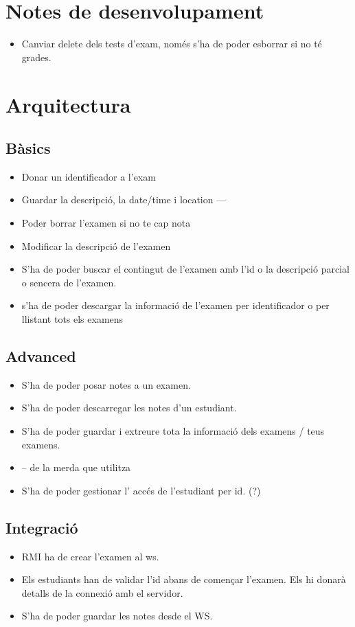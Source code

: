 \documentclass[11pt]{article}
\begin{document}
\section{Notes de desenvolupament}
\label{sec:orgca8addf}
\begin{itemize}
\item Canviar delete dels tests d'exam, només s'ha de poder esborrar
si no té grades.
\end{itemize}

\section{Arquitectura}
\label{sec:org4ad13be}
\subsection{Bàsics}
\label{sec:orgffb52f9}
\begin{itemize}
\item Donar un identificador a l'exam
\item Guardar la descripció, la date/time i location
---
\item Poder borrar l'examen si no te cap nota
\item Modificar la descripció de l'examen
\item S'ha de poder buscar el contingut de l'examen amb l'id
o la descripció parcial o sencera de l'examen.
\item s'ha de poder descargar la informació de l'examen per
identificador o per llistant tots els examens
\end{itemize}

\subsection{Advanced}
\label{sec:orga6cea7c}
\begin{itemize}
\item S'ha de poder posar notes a un examen.
\item S'ha de poder descarregar les notes d'un estudiant.
\item S'ha de poder guardar i extreure tota la informació dels
examens / teus examens.
\item -- de la merda que utilitza
\item S'ha de poder gestionar l' accés de l'estudiant per id. (?)
\end{itemize}

\subsection{Integració}
\label{sec:orga80b96f}
\begin{itemize}
\item RMI ha de crear l'examen al ws.
\item Els estudiants han de validar l'id abans de començar
l'examen. Els hi donarà detalls de la connexió amb el
servidor.
\item S'ha de poder guardar les notes desde el WS.
\end{itemize}
\end{document}
